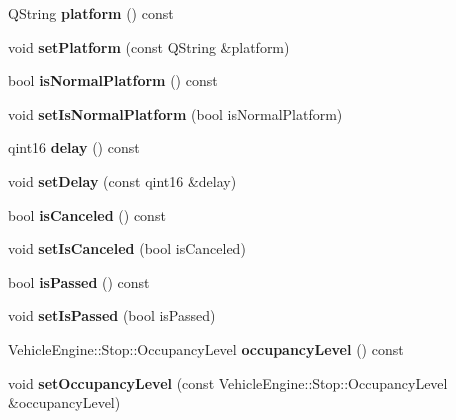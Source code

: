 \begin{DoxyCompactItemize}
\mbox{\label{classRouterEngine_1_1RouteLegEnd_a5cd38e1cde6c5632b60a183226825732}} 
Q\+String {\bfseries platform} () const
\item 
\mbox{\label{classRouterEngine_1_1RouteLegEnd_ab44931f5c47e9497355d47ba44b896e5}} 
void {\bfseries set\+Platform} (const Q\+String \&platform)
\item 
\mbox{\label{classRouterEngine_1_1RouteLegEnd_a24879496826d9e513cf6ffb393237db8}} 
bool {\bfseries is\+Normal\+Platform} () const
\item 
\mbox{\label{classRouterEngine_1_1RouteLegEnd_acfa2dac12a3e1e3f7a8bab5e9f55482b}} 
void {\bfseries set\+Is\+Normal\+Platform} (bool is\+Normal\+Platform)
\item 
\mbox{\label{classRouterEngine_1_1RouteLegEnd_ae8c0b35f77c5a66d5d5afa96f7eb4625}} 
qint16 {\bfseries delay} () const
\item 
\mbox{\label{classRouterEngine_1_1RouteLegEnd_a693365fb2083839ddd5ebf17d5032121}} 
void {\bfseries set\+Delay} (const qint16 \&delay)
\item 
\mbox{\label{classRouterEngine_1_1RouteLegEnd_afb87a99a388b7dd36c5357f57aeb361b}} 
bool {\bfseries is\+Canceled} () const
\item 
\mbox{\label{classRouterEngine_1_1RouteLegEnd_ace382e058479c3ec424d8321df838667}} 
void {\bfseries set\+Is\+Canceled} (bool is\+Canceled)
\item 
\mbox{\label{classRouterEngine_1_1RouteLegEnd_afb7a50823d8529b913832bd358bf4983}} 
bool {\bfseries is\+Passed} () const
\item 
\mbox{\label{classRouterEngine_1_1RouteLegEnd_af96b512dc585624f8d9bbaed165dafb8}} 
void {\bfseries set\+Is\+Passed} (bool is\+Passed)
\item 
\mbox{\label{classRouterEngine_1_1RouteLegEnd_ad5ddf5854bee2bf268728707b405ae4c}} 
Vehicle\+Engine\+::\+Stop\+::\+Occupancy\+Level {\bfseries occupancy\+Level} () const
\item 
\mbox{\label{classRouterEngine_1_1RouteLegEnd_ad71a1a0c0d96125eb1833bc63cd4abbf}} 
void {\bfseries set\+Occupancy\+Level} (const Vehicle\+Engine\+::\+Stop\+::\+Occupancy\+Level \&occupancy\+Level)
\end{DoxyCompactItemize}

